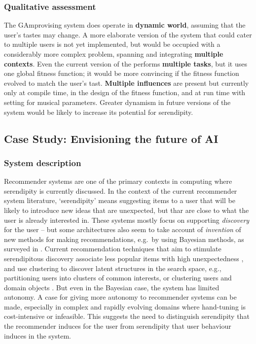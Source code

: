 \subsubsection{Qualitative assessment}

The {\sf GAmprovising} system does operate in \textbf{dynamic world},
assuming that the user's tastes may change.  A more elaborate version
of the system that could cater to multiple users is not yet
implemented, but would be occupied with a considerably more complex
problem, spanning and integrating \textbf{multiple contexts}.  Even
the current version of the performs \textbf{multiple tasks}, but it
uses one global fitness function; it would be more convincing if the
fitness function evolved to match the user's tast.  \textbf{Multiple
  influences} are present but currently only at compile time, in the
design of the fitness function, and at run time with setting for
musical parameters.  Greater dynamism in future versions of the system
would be likely to increase its potential for serendipity.

\subsection{Case Study: Envisioning the future of AI} \label{sec:nextgenrec}

\subsubsection{System description}

Recommender systems are one of the primary contexts in computing where
serendipity is currently discussed.  In the context of the current
recommender system literature, `serendipity' means suggesting items to
a user that will be likely to introduce new ideas that are unexpected,
but thar are close to what the user is already interested in.  These
systems mostly focus on supporting \emph{discovery} for the user --
but some architectures also seem to take account of \emph{invention}
of new methods for making recommendations, e.g.~by using Bayesian
methods, as surveyed in .  Current
recommendation techniques that aim to stimulate serendipitous
discovery associate less popular items with high unexpectedness
\cite{Herlocker2004,Lu2012}, and use clustering to discover latent
structures in the search space, e.g., partitioning users into clusters
of common interests, or clustering users and domain objects
\cite{Kamahara2005,Onuma2009,Zhang2011}.  But even in the Bayesian
case, the system has limited autonomy.  A case for giving more
autonomy to recommender systems can be made, especially in complex and
rapidly evolving domains where hand-tuning is cost-intensive or
infeasible.  This suggests the need to distinguish serendipity that
the recommender induces for the user from serendipity that user
behaviour induces in the system.

